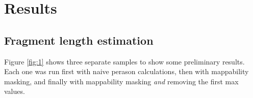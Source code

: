 \documentclass[a4paper]{article}
\begin{document}
  \section{Results}

    \subsection{Fragment length estimation}
    Figure \ref{fig:1} shows three separate samples to show some preliminary results. Each one was run first with naive perason calculations,
    then with mappability masking, and finally with mappability masking \textit{and} removing the first max values.
    \begin{figure}[htp]


\end{figure}
\end{document}
